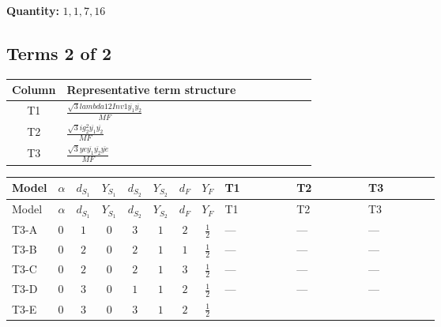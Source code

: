 \documentclass[8pt]{article}
\begin{document}
\begin{landscape}
\begin{longtable}{@{}llcccccc >{\raggedright\arraybackslash}p{0.21\linewidth} >{\raggedright\arraybackslash}p{0.21\linewidth} >{\raggedright\arraybackslash}p{0.21\linewidth}@{}}
\midrule
\bottomrule
\end{longtable}
\clearpage
\noindent\textbf{Quantity: }$\mathrm{1,1,7,16}$\par\smallskip
\subsection*{Terms 2 of 2}
\begin{center}
\begin{tabular}{@{}c >{\raggedright\arraybackslash}p{0.82\linewidth}@{}}
\toprule
Column & Representative term structure \\
\midrule
T1 & \(\displaystyle \frac{\sqrt{3} lambda12Inv1 \overline{y_{1}} \overline{y_{2}}}{MF}\) \\
\midrule
T2 & \(\displaystyle \frac{\sqrt{3} i g_{2}^{2} \overline{y_{1}} \overline{y_{2}}}{MF}\) \\
\midrule
T3 & \(\displaystyle \frac{\sqrt{3} ye \overline{y_{1}} \overline{y_{2}} \overline{ye}}{MF}\) \\
\midrule
\bottomrule
\end{tabular}
\end{center}
\smallskip
\tiny
\begin{longtable}{@{}llcccccc >{\raggedright\arraybackslash}p{0.21\linewidth} >{\raggedright\arraybackslash}p{0.21\linewidth} >{\raggedright\arraybackslash}p{0.21\linewidth}@{}}
\toprule
Model & $\alpha$ & $d_{S_1}$ & $Y_{S_1}$ & $d_{S_2}$ & $Y_{S_2}$ & $d_F$ & $Y_F$ & T1 & T2 & T3 \\
\midrule
\endfirsthead
\toprule
Model & $\alpha$ & $d_{S_1}$ & $Y_{S_1}$ & $d_{S_2}$ & $Y_{S_2}$ & $d_F$ & $Y_F$ & T1 & T2 & T3 \\
\midrule
\endhead
T3-A & $0$ & $1$ & $0$ & $3$ & $1$ & $2$ & $\frac{1}{2}$ & --- & --- & --- \\
\midrule
T3-B & $0$ & $2$ & $0$ & $2$ & $1$ & $1$ & $\frac{1}{2}$ & --- & --- & --- \\
\midrule
T3-C & $0$ & $2$ & $0$ & $2$ & $1$ & $3$ & $\frac{1}{2}$ & --- & --- & --- \\
\midrule
T3-D & $0$ & $3$ & $0$ & $1$ & $1$ & $2$ & $\frac{1}{2}$ & --- & --- & --- \\
\midrule
T3-E & $0$ & $3$ & $0$ & $3$ & $1$ & $2$ & $\frac{1}{2}$ & \scriptsize\adjustbox{max width=\linewidth}{$\begin{gathered} \frac{\sqrt{3} lambda12Inv1 \overline{y_{1}} \overline{y_{2}}}{6 MF}\end{gathered}$} & \scriptsize\adjustbox{max width=\linewidth}{$\begin{gathered} \frac{\sqrt{3} i g_{2}^{2} \overline{y_{1}} \overline{y_{2}}}{6 MF}\end{gathered}$} & \scriptsize\adjustbox{max width=\linewidth}{$\begin{gathered} \frac{\sqrt{3} ye \overline{y_{1}} \overline{y_{2}} \overline{ye}}{12 MF}\end{gathered}$} \\
\midrule
\bottomrule
\end{longtable}
\clearpage

\end{landscape}
\end{document}
